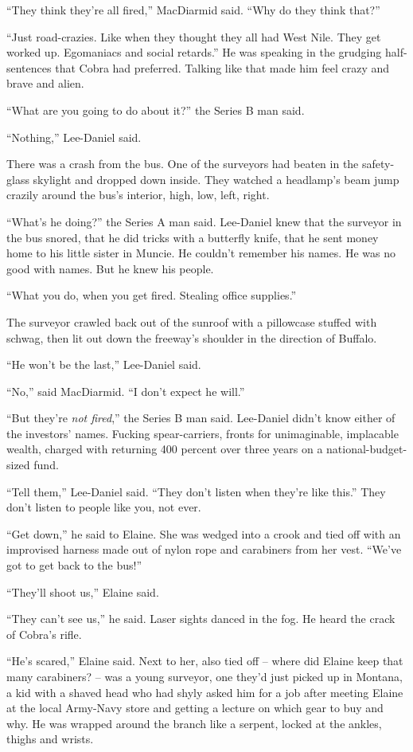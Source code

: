 “They think they're all fired,” MacDiarmid said. “Why do they 
think that?”

“Just road-crazies. Like when they thought they all had West Nile. 
They get worked up. Egomaniacs and social retards.” He was speaking 
in the grudging half-sentences that Cobra had preferred. Talking like 
that made him feel crazy and brave and alien.

“What are you going to do about it?” the Series B man said.

“Nothing,” Lee-Daniel said.

There was a crash from the bus. One of the surveyors had beaten in the 
safety-glass skylight and dropped down inside. They watched a 
headlamp's beam jump crazily around the bus's interior, high, low, 
left, right.

“What's he doing?” the Series A man said. Lee-Daniel knew that the 
surveyor in the bus snored, that he did tricks with a butterfly knife, 
that he sent money home to his little sister in Muncie. He couldn't 
remember his names. He was no good with names. But he knew his people.

“What you do, when you get fired. Stealing office supplies.”

The surveyor crawled back out of the sunroof with a pillowcase stuffed 
with schwag, then lit out down the freeway's shoulder in the direction 
of Buffalo.

“He won't be the last,” Lee-Daniel said.

“No,” said MacDiarmid. “I don't expect he will.”

“But they're \emph{not fired},” the Series B man said. Lee-Daniel 
didn't know either of the investors' names. Fucking spear-carriers, 
fronts for unimaginable, implacable wealth, charged with returning 400 
percent over three years on a national-budget-sized fund.

“Tell them,” Lee-Daniel said. “They don't listen when they're 
like this.” They don't listen to people like you, not ever.

\tb

“Get down,” he said to Elaine. She was wedged into a crook and tied 
off with an improvised harness made out of nylon rope and carabiners 
from her vest. “We've got to get back to the bus!”

“They'll shoot us,” Elaine said.

“They can't see us,” he said. Laser sights danced in the fog. He 
heard the crack of Cobra's rifle.

“He's scared,” Elaine said. Next to her, also tied off -- where did 
Elaine keep that many carabiners? -- was a young surveyor, one they'd 
just picked up in Montana, a kid with a shaved head who had shyly asked 
him for a job after meeting Elaine at the local Army-Navy store and 
getting a lecture on which gear to buy and why. He was wrapped around 
the branch like a serpent, locked at the ankles, thighs and wrists.


